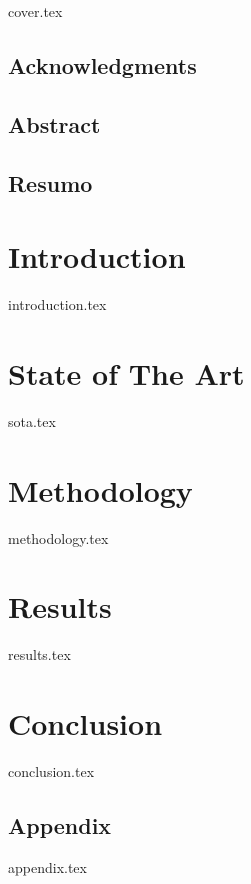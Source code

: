 \documentclass[a4paper, 12pt]{report}
\begin{document}
{cover.tex}
\newpage
\printglossary[type=\acronymtype]

\newpage
\listoffigures

\newpage
\listoftables

\newpage
\tableofcontents
\frontmatter
\section*{Acknowledgments}

\newpage
\section*{Abstract}

\newpage
\section*{Resumo}

\mainmatter


\newpage
\chapter{Introduction}
{introduction.tex}

\newpage
\chapter{State of The Art}
{sota.tex}

\newpage
\chapter{Methodology}
{methodology.tex}
\newpage
\chapter{Results}
{results.tex}

\newpage
\chapter{Conclusion}
{conclusion.tex}

\newpage
\printbibliography

\newpage
\section*{Appendix}
{appendix.tex}
\end{document}
